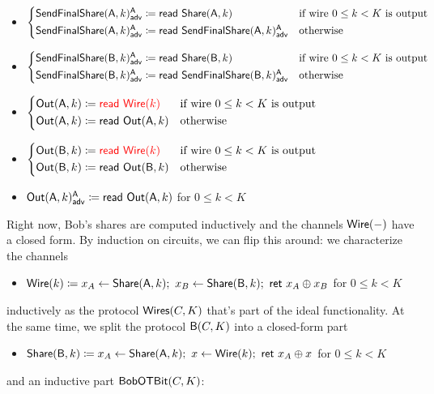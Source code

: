 \begin{itemize}
\item {\color{blue} $\begin{cases*} \LeakSendFinalShare(\A,k)^\A_\adv \coloneqq \read{\Share(\A,k)} & \text{if wire $0 \leq k < K$ is output} \\ \LeakSendFinalShare(\A,k)^\A_\adv \coloneqq \read{\LeakSendFinalShare(\A,k)^\A_\adv} & \text{otherwise} \end{cases*}$}
\item {\color{blue} $\begin{cases*} \LeakSendFinalShare(\B,k)^\A_\adv \coloneqq \read{\Share(\B,k)} & \text{if wire $0 \leq k < K$ is output} \\ \LeakSendFinalShare(\B,k)^\A_\adv \coloneqq \read{\LeakSendFinalShare(\B,k)^\A_\adv} & \text{otherwise} \end{cases*}$}
\item $\begin{cases*} \Out(\A,k) \coloneqq {\color{red} \read{\Wire(k)}} & \text{if wire $0 \leq k < K$ is output} \\ \Out(\A,k) \coloneqq \read{\Out(\A,k)} & \text{otherwise} \end{cases*}$
\item $\begin{cases*} \Out(\B,k) \coloneqq {\color{red} \read{\Wire(k)}} & \text{if wire $0 \leq k < K$ is output} \\ \Out(\B,k) \coloneqq \read{\Out(\B,k)} & \text{otherwise} \end{cases*}$
\item {\color{blue} $\mathsf{Out}(\mathsf{A},k)^{\mathsf{A}}_{\mathsf{adv}} \coloneqq \mathsf{read} \ \mathsf{Out}(\mathsf{A},k)$ for $0 \leq k < K$}
\end{itemize}

\noindent Right now, Bob's shares are computed inductively and the channels $\mathsf{Wire}(-)$ have a closed form. By induction on circuits, we can flip this around: we characterize the channels
\begin{itemize}
\item $\mathsf{Wire}(k) \coloneqq x_A \leftarrow \mathsf{Share}(\mathsf{A},k); \ x_B \leftarrow \mathsf{Share}(\mathsf{B},k); \ \mathsf{ret} \ x_A \oplus x_B$ for $0 \leq k < K$
\end{itemize}
inductively as the protocol $\mathsf{Wires}(C,K)$ that's part of the ideal functionality. At the same time, we split the protocol $\mathsf{B}(C,K)$ into a closed-form part
\begin{itemize}
\item $\mathsf{Share}(\mathsf{B},k) \coloneqq x_A \leftarrow \mathsf{Share}(\mathsf{A},k); \ x \leftarrow \mathsf{Wire}(k); \ \mathsf{ret} \ x_A \oplus x$ for $0 \leq k < K$
\end{itemize}
and an inductive part $\mathsf{BobOTBit}(C,K)$:

